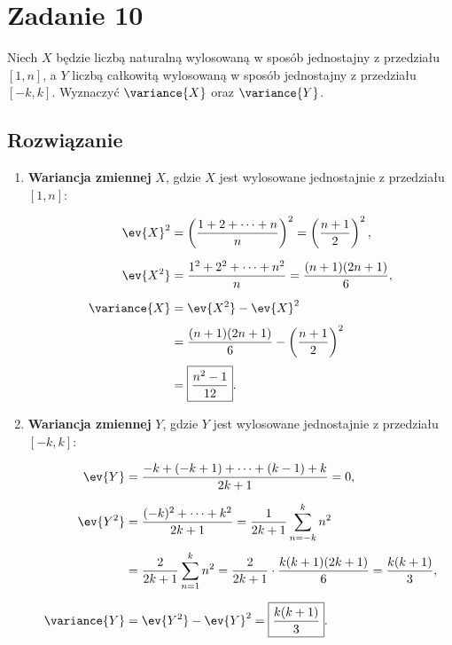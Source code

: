 \section{Zadanie 10}
Niech \(X\) będzie liczbą naturalną wylosowaną w sposób jednostajny z przedziału \([1, n]\),
a \(Y\) liczbą całkowitą wylosowaną w sposób jednostajny z przedziału \([-k, k]\).
Wyznaczyć \(\variance{X}\) oraz \(\variance{Y}\).

\subsection*{Rozwiązanie}
\begin{enumerate}

	\item \textbf{Wariancja zmiennej} \(X\), gdzie \(X\) jest wylosowane jednostajnie z przedziału \([1, n]\):

	      \[
		      \begin{aligned}
			      \ev{X}^2
			       & = \left( \frac{1 + 2 + \dots + n}{n} \right)^2
			      = \left( \frac{n + 1}{2} \right)^2,                               \\[6pt]
			      \ev{X^2}
			       & = \frac{1^2 + 2^2 + \dots + n^2}{n}
			      = \frac{(n + 1)(2n + 1)}{6},                                      \\[6pt]
			      \variance{X}
			       & = \ev{X^2} - \ev{X}^2                                          \\[3pt]
			       & = \frac{(n + 1)(2n + 1)}{6} - \left( \frac{n + 1}{2} \right)^2 \\[3pt]
			       & = \boxed{\frac{n^2 - 1}{12}}.
		      \end{aligned}
	      \]

	\item \textbf{Wariancja zmiennej} \(Y\), gdzie \(Y\) jest wylosowane jednostajnie z przedziału \([-k, k]\):

	      \[
		      \begin{aligned}
			      \ev{Y}
			       & = \frac{-k + (-k+1) + \dots + (k-1) + k}{2k+1}
			      = 0,                                              \\[6pt]
			      \ev{Y^2}
			       & = \frac{(-k)^2 + \dots + k^2}{2k+1}
			      = \frac{1}{2k+1}\sum_{n=-k}^{k} n^2               \\[3pt]
			       & = \frac{2}{2k+1}\sum_{n=1}^{k} n^2
			      = \frac{2}{2k+1} \cdot \frac{k(k+1)(2k+1)}{6}
			      = \frac{k(k+1)}{3},                               \\[6pt]
			      \variance{Y}
			       & = \ev{Y^2} - \ev{Y}^2
			      = \boxed{\frac{k(k+1)}{3}}.
		      \end{aligned}
	      \]

\end{enumerate}
